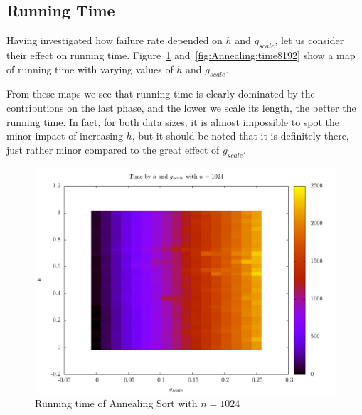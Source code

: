 \subsection{Running Time}

Having investigated how failure rate depended on $h$ and $g_{scale}$, let us consider their effect on running time. Figure~\ref{fig:Annealing:time1024} and~\ref{fig:Annealing:time8192} show a map of running time with varying values of $h$ and $g_{scale}$.

From these maps we see that running time is clearly dominated by the contributions on the last phase, and the lower we scale its length, the better the running time. In fact, for both data sizes, it is almost impossible to spot the minor impact of increasing $h$, but it should be noted that it is definitely there, just rather minor compared to the great effect of $g_{scale}$.

\begin{figure}
\center
\includegraphics[width=\textwidth]{graphs/Annealing/annealing1024time.pdf}
\caption{Running time of Annealing Sort with  $n = 1024$}
\label{fig:Annealing:time1024}
\end{figure}

